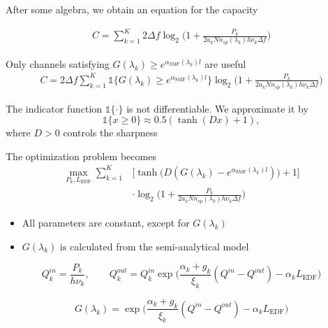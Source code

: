 \documentclass[10pt]{beamer}
\begin{document}
\begin{frame}

After some algebra, we obtain an equation for the capacity

\begin{align} \nonumber
C =\sum_{k = 1}^{K} 2\Delta f\log_2\Bigg(1 + \frac{P_k}{2a_kNn_{sp}(\lambda_k)h\nu_k\Delta f}\Bigg)
\end{align}

\end{frame}

\begin{frame}

Only channels satisfying $G(\lambda_k) \geq e^{\alpha_{\text{SMF}}(\lambda_k)l}$ are useful 
~
\begin{align} \nonumber
C =2\Delta f\sum_{k = 1}^{K} \mathds{1}\{G(\lambda_k) \geq e^{\alpha_{\text{SMF}}(\lambda_k)l}\} \log_2\Bigg(1 + \frac{P_k}{2a_kNn_{sp}(\lambda_k)h\nu_k\Delta f}\Bigg)
\end{align}

The indicator function $\mathds{1}\{\cdot\}$ is not differentiable. We approximate it by
\begin{equation*}
\mathds{1}\{x \geq 0\} \approx 0.5(\tanh(Dx) + 1),
\end{equation*}
where $D>0$ controls the sharpness

\end{frame}


\begin{frame}
The optimization problem becomes
~
\begin{align} \nonumber
\max_{P_k, L_{\text{EDF}}}\sum_{k = 1}^{K} &\Big[\tanh\Big(D(G(\lambda_k) - e^{\alpha_{\text{SMF}}(\lambda_k)l})\Big) + 1\Big] \\ \nonumber
&\cdot\log_2\Bigg(1 + \frac{P_k}{2a_kNn_{sp}(\lambda_k)h\nu_k\Delta f}\Bigg)
\end{align}

\begin{itemize}
	\item All parameters are constant, except for $G(\lambda_k)$
	\item $G(\lambda_k)$ is calculated from the semi-analytical model
\end{itemize}

\begin{equation} \nonumber
Q^{in}_k = \frac{P_k}{h\nu_k}, \qquad Q^{out}_k = Q^{in}_k\exp\Big(\frac{\alpha_k + g_k}{\xi_k}(Q^{in} - Q^{out}) - \alpha_kL_{\text{EDF}}\Big)
\end{equation}

\begin{equation} \nonumber
G(\lambda_k) = \exp\Big(\frac{\alpha_k + g_k}{\xi_k}(Q^{in} - Q^{out}) - \alpha_kL_{\text{EDF}}\Big)
\end{equation}

\end{frame}
\end{document}
